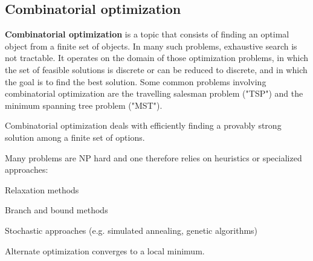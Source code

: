 \documentclass[12pt]{article}
\begin{document}
\subsection{Combinatorial optimization}
\par \textbf{Combinatorial optimization} is a topic that consists of finding an optimal object from a finite set of objects. In many such problems, exhaustive search is not tractable. It operates on the domain of those optimization problems, in which the set of feasible solutions is discrete or can be reduced to discrete, and in which the goal is to find the best solution. Some common problems involving combinatorial optimization are the travelling salesman problem ("TSP") and the minimum spanning tree problem ("MST").
\par Combinatorial optimization deals with efficiently finding a provably strong solution among a finite set of options.
\par Many problems are NP hard and one therefore relies on heuristics or specialized approaches:
\ulb
\item Relaxation methods
\item Branch and bound methods
\item Stochastic approaches (e.g. simulated annealing, genetic algorithms)
\ule
\par Alternate optimization converges to a local minimum.
\end{document}
